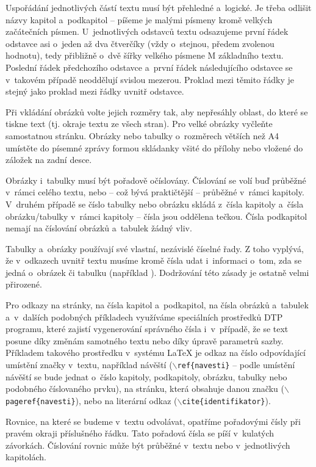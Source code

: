 Uspořádání jednotlivých částí textu musí být přehledné a~logické. Je třeba odlišit názvy kapitol a~podkapitol -- píšeme je malými písmeny kromě velkých začátečních písmen. U~jednotlivých odstavců textu odsazujeme první řádek odstavce asi o~jeden až dva čtverčíky (vždy o~stejnou, předem zvolenou hodnotu), tedy přibližně o~dvě šířky velkého písmene M základního textu. Poslední řádek předchozího odstavce a~první řádek následujícího odstavce se v~takovém případě neoddělují svislou mezerou. Proklad mezi těmito řádky je stejný jako proklad mezi řádky uvnitř odstavce.

Při vkládání obrázků volte jejich rozměry tak, aby nepřesáhly oblast, do které se tiskne text (tj. okraje textu ze všech stran). Pro velké obrázky vyčleňte samostatnou stránku. Obrázky nebo tabulky o~rozměrech větších než A4 umístěte do písemné zprávy formou skládanky všité do přílohy nebo vložené do záložek na zadní desce.

Obrázky i~tabulky musí být pořadově očíslovány. Číslování se volí buď průběžné v~rámci celého textu, nebo -- což bývá praktičtější -- průběžné v~rámci kapitoly. V~druhém případě se číslo tabulky nebo obrázku skládá z~čísla kapitoly a~čísla obrázku/tabulky v~rámci kapitoly -- čísla jsou oddělena tečkou. Čísla podkapitol nemají na číslování obrázků a~tabulek žádný vliv.

Tabulky a~obrázky používají své vlastní, nezávislé číselné řady. Z toho vyplývá, že v~odkazech uvnitř textu musíme kromě čísla udat i~informaci o~tom, zda se jedná o~obrázek či tabulku (například ). Dodržování této zásady je ostatně velmi přirozené.

Pro odkazy na stránky, na čísla kapitol a~podkapitol, na čísla obrázků a~tabulek a~v~dalších podobných příkladech využíváme speciálních prostředků DTP programu, které zajistí vygenerování správného čísla i~v~případě, že se text posune díky změnám samotného textu nebo díky úpravě parametrů sazby. Příkladem takového prostředku v~systému LaTeX je odkaz na číslo odpovídající umístění značky v~textu, například návěští ($\backslash${\tt ref\{navesti\}} -- podle umístění návěští se bude jednat o~číslo kapitoly, podkapitoly, obrázku, tabulky nebo podobného číslovaného prvku), na stránku, která obsahuje danou značku ($\backslash${\tt pageref\{navesti\}}), nebo na literární odkaz ($\backslash${\tt cite\{identifikator\}}).

Rovnice, na které se budeme v~textu odvolávat, opatříme pořadovými čísly při pravém okraji příslušného řádku. Tato pořadová čísla se píší v~kulatých závorkách. Číslování rovnic může být průběžné v~textu nebo v~jednotlivých kapitolách.

